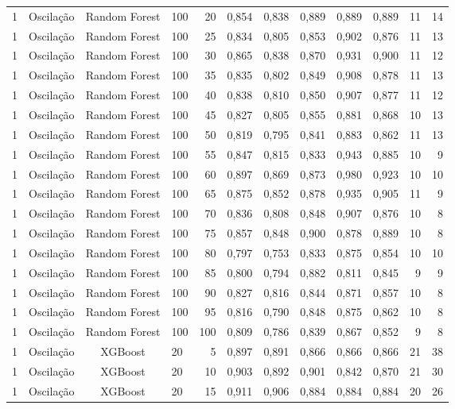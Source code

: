 \begin{longtable}{ccclrrrrrrrr}
1 & Oscilação & Random Forest & 100 & 20 & 0,854 & 0,838 & 0,889 & 0,889 & 0,889 & 11 & 14 \\
1 & Oscilação & Random Forest & 100 & 25 & 0,834 & 0,805 & 0,853 & 0,902 & 0,876 & 11 & 13 \\
1 & Oscilação & Random Forest & 100 & 30 & 0,865 & 0,838 & 0,870 & 0,931 & 0,900 & 11 & 12 \\
1 & Oscilação & Random Forest & 100 & 35 & 0,835 & 0,802 & 0,849 & 0,908 & 0,878 & 11 & 13 \\
1 & Oscilação & Random Forest & 100 & 40 & 0,838 & 0,810 & 0,850 & 0,907 & 0,877 & 11 & 12 \\
1 & Oscilação & Random Forest & 100 & 45 & 0,827 & 0,805 & 0,855 & 0,881 & 0,868 & 10 & 13 \\
1 & Oscilação & Random Forest & 100 & 50 & 0,819 & 0,795 & 0,841 & 0,883 & 0,862 & 11 & 13 \\
1 & Oscilação & Random Forest & 100 & 55 & 0,847 & 0,815 & 0,833 & 0,943 & 0,885 & 10 & 9 \\
1 & Oscilação & Random Forest & 100 & 60 & 0,897 & 0,869 & 0,873 & 0,980 & 0,923 & 10 & 10 \\
1 & Oscilação & Random Forest & 100 & 65 & 0,875 & 0,852 & 0,878 & 0,935 & 0,905 & 11 & 9 \\
1 & Oscilação & Random Forest & 100 & 70 & 0,836 & 0,808 & 0,848 & 0,907 & 0,876 & 10 & 8 \\
1 & Oscilação & Random Forest & 100 & 75 & 0,857 & 0,848 & 0,900 & 0,878 & 0,889 & 10 & 8 \\
1 & Oscilação & Random Forest & 100 & 80 & 0,797 & 0,753 & 0,833 & 0,875 & 0,854 & 10 & 10 \\
1 & Oscilação & Random Forest & 100 & 85 & 0,800 & 0,794 & 0,882 & 0,811 & 0,845 & 9 & 9 \\
1 & Oscilação & Random Forest & 100 & 90 & 0,827 & 0,816 & 0,844 & 0,871 & 0,857 & 10 & 8 \\
1 & Oscilação & Random Forest & 100 & 95 & 0,816 & 0,790 & 0,848 & 0,875 & 0,862 & 10 & 8 \\
1 & Oscilação & Random Forest & 100 & 100 & 0,809 & 0,786 & 0,839 & 0,867 & 0,852 & 9 & 8 \\
1 & Oscilação & XGBoost & 20 & 5 & 0,897 & 0,891 & 0,866 & 0,866 & 0,866 & 21 & 38 \\
1 & Oscilação & XGBoost & 20 & 10 & 0,903 & 0,892 & 0,901 & 0,842 & 0,870 & 21 & 30 \\
1 & Oscilação & XGBoost & 20 & 15 & 0,911 & 0,906 & 0,884 & 0,884 & 0,884 & 20 & 26 \\

\end{longtable}
